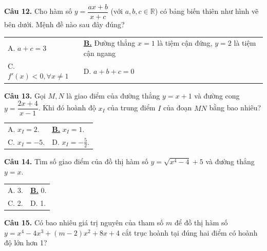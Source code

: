 \documentclass[12pt,a4paper]{article}
\makeatletter
\newcommand{\choiceB}[4]{

    \par\vspace{0.5em}\noindent

    \begin{tabularx}{\textwidth}{@{}X X@{}}

    A. #1 & \underline{\textbf{B.}} #2 \\[1.2em]

    C. #3 & D. #4

    \end{tabularx}

}
\makeatother
\begin{document}
\textbf{Câu 12.} Cho hàm số $y = \dfrac{ax+b}{x+c}$ (với $a, b, c \in \mathbb{R}$) có bảng biến thiên như hình vẽ bên dưới. Mệnh đề nào sau đây đúng?

\begin{center}


\end{center}

\choiceB{$a + c = 3$}{Đường thẳng $x = 1$ là tiệm cận đứng, $y = 2$ là tiệm cận ngang}{$f'(x) < 0, \forall x \neq 1$}{$a + b + c = 0$}



\textbf{Câu 13.} Gọi $M, N$ là giao điểm của đường thẳng $y=x+1$ và đường cong $y=\dfrac{2x+4}{x-1}$. Khi đó hoành độ $x_I$ của trung điểm $I$ của đoạn $MN$ bằng bao nhiêu?

\choiceB{$x_I = 2$.}{$x_I = 1$.}{$x_I = -5$.}{$x_I = -\frac{5}{2}$.}



\textbf{Câu 14.} Tìm số giao điểm của đồ thị hàm số $y=\sqrt{x^4-4}+5$ và đường thẳng $y=x$.

\choiceB{3.}{0.}{2.}{1.}



\textbf{Câu 15.} Có bao nhiêu giá trị nguyên của tham số $m$ để đồ thị hàm số $y=x^4-4x^3+(m-2)x^2+8x+4$ cắt trục hoành tại đúng hai điểm có hoành độ lớn hơn 1?
\end{document}
